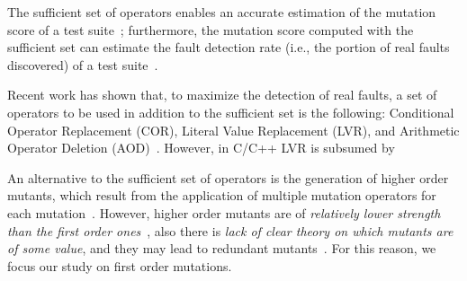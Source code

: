 The sufficient set of operators enables an accurate estimation of the mutation score of a test suite~\cite{siami2008sufficient}; furthermore, the mutation score computed with the sufficient set can estimate the fault detection rate (i.e., the portion of real faults discovered) of a test suite~\cite{andrews2005mutation}. 

Recent work has shown that, to maximize the detection of real faults, a set of operators to be used in addition to the sufficient set is the following: Conditional Operator Replacement (COR),
Literal Value Replacement (LVR), and Arithmetic Operator Deletion (AOD)~\cite{Kintis2018}. However, in C/C++ LVR is subsumed by 

An alternative to the sufficient set of operators is the generation of higher order mutants, which result from the application of multiple mutation operators for each mutation~\cite{jia2009higher,kintis2010evaluating,offutt1992investigations,papadakis2010empirical}. However, higher order mutants are of \emph{relatively lower strength than the first order ones}~\cite{papadakis2010mutation,papadakis2019mutation}, also there is \emph{lack of clear theory on which mutants are of some value}, and they may lead to redundant mutants~\cite{papadakis2019mutation}. For this reason, we focus our study on first order mutations.

%
%
%


